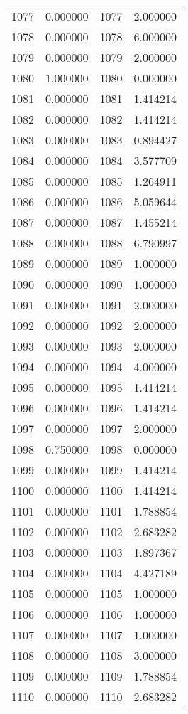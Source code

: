 \documentclass[12pt]{article}
\begin{document}
\begin{longtable}{@{}cccc@{}}
1077 & 0.000000 & 1077 & 2.000000 \\
1078 & 0.000000 & 1078 & 6.000000 \\
1079 & 0.000000 & 1079 & 2.000000 \\
1080 & 1.000000 & 1080 & 0.000000 \\
1081 & 0.000000 & 1081 & 1.414214 \\
1082 & 0.000000 & 1082 & 1.414214 \\
1083 & 0.000000 & 1083 & 0.894427 \\
1084 & 0.000000 & 1084 & 3.577709 \\
1085 & 0.000000 & 1085 & 1.264911 \\
1086 & 0.000000 & 1086 & 5.059644 \\
1087 & 0.000000 & 1087 & 1.455214 \\
1088 & 0.000000 & 1088 & 6.790997 \\
1089 & 0.000000 & 1089 & 1.000000 \\
1090 & 0.000000 & 1090 & 1.000000 \\
1091 & 0.000000 & 1091 & 2.000000 \\
1092 & 0.000000 & 1092 & 2.000000 \\
1093 & 0.000000 & 1093 & 2.000000 \\
1094 & 0.000000 & 1094 & 4.000000 \\
1095 & 0.000000 & 1095 & 1.414214 \\
1096 & 0.000000 & 1096 & 1.414214 \\
1097 & 0.000000 & 1097 & 2.000000 \\
1098 & 0.750000 & 1098 & 0.000000 \\
1099 & 0.000000 & 1099 & 1.414214 \\
1100 & 0.000000 & 1100 & 1.414214 \\
1101 & 0.000000 & 1101 & 1.788854 \\
1102 & 0.000000 & 1102 & 2.683282 \\
1103 & 0.000000 & 1103 & 1.897367 \\
1104 & 0.000000 & 1104 & 4.427189 \\
1105 & 0.000000 & 1105 & 1.000000 \\
1106 & 0.000000 & 1106 & 1.000000 \\
1107 & 0.000000 & 1107 & 1.000000 \\
1108 & 0.000000 & 1108 & 3.000000 \\
1109 & 0.000000 & 1109 & 1.788854 \\
1110 & 0.000000 & 1110 & 2.683282 \\

\end{longtable}
\end{document}
